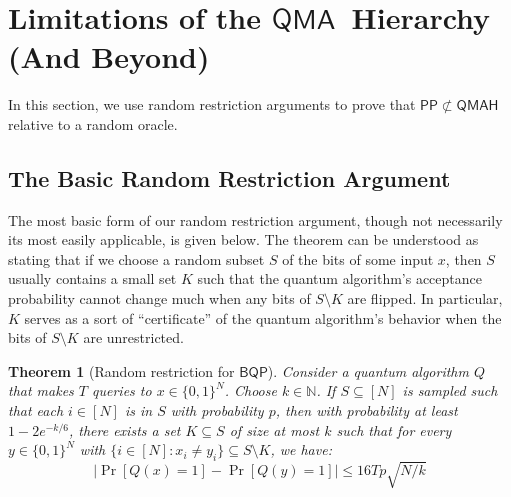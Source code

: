 \documentclass[10pt,a4paper]{article}
\newtheorem{theorem}{Theorem}
\newcommand{\Naturals}{\mathbb{N}}
\begin{document}
\section{Limitations of the \texorpdfstring{$\mathsf{QMA}$}{QMA}\ Hierarchy (And Beyond)}
In this section, we use random restriction arguments to prove that $\mathsf{PP} \not\subset \mathsf{QMAH}$ relative to a random oracle.

\subsection{The Basic Random Restriction Argument}
The most basic form of our random restriction argument, though not necessarily its most easily applicable, is given below. The theorem can be understood as stating that if we choose a random subset $S$ of the bits of some input $x$, then $S$ usually contains a small set $K$ such that the quantum algorithm's acceptance probability cannot change much when any bits of $S \setminus K$ are flipped. In particular, $K$ serves as a sort of ``certificate'' of the quantum algorithm's behavior when the bits of $S \setminus K$ are unrestricted.

\begin{theorem}[Random restriction for $\mathsf{BQP}$]
\label{thm:bqp_random_restriction}
Consider a quantum algorithm $Q$ that makes $T$ queries to $x \in \{0,1\}^N$. Choose $k \in \Naturals$. If $S \subseteq [N]$ is sampled such that each $i \in [N]$ is in $S$ with probability $p$, then with probability at least $1 - 2e^{-k/6}$, there exists a set $K \subseteq S$ of size at most $k$ such that for every $y \in \{0,1\}^N$ with $\{i \in [N] : x_i \neq y_i\} \subseteq S \setminus K$, we have:
\[ \left|\Pr\left[Q(x) = 1 \right] - \Pr\left[Q(y) = 1 \right] \right| \le 16Tp\sqrt{N/k}\]
\end{theorem}
\end{document}
